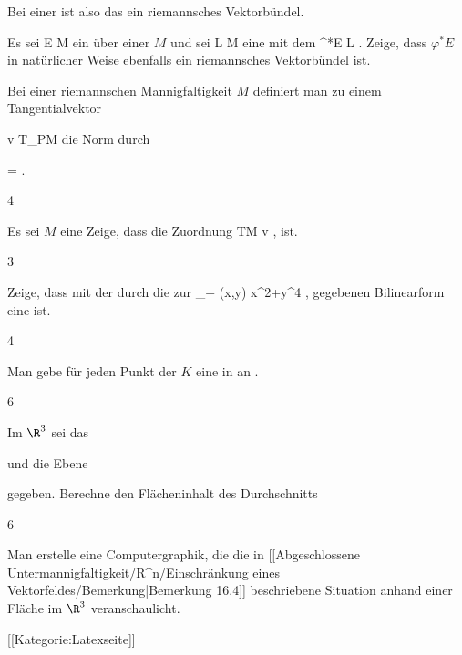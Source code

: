 Bei einer
ist also das
ein riemannsches Vektorbündel.

{}
{

Es sei
 { E } { M
} {}
ein
über einer
$M$ und sei
\maabb {\varphi} { L } { M
} {}
eine
mit dem
\maabb {} {\varphi^*E} {L
} {.}
Zeige, dass $\varphi^*E$ in natürlicher Weise ebenfalls ein riemannsches Vektorbündel ist.

}
{} {}


Bei einer riemannschen Mannigfaltigkeit $M$ definiert man zu einem Tangentialvektor

\mavergleichskette
{\vergleichskette
{ v
}
{ \in }{ T_PM
}
{  }{
}
{    }{
}
{   }{
}
}
{}{}{}
die Norm durch

\mavergleichskette
{\vergleichskette
{  \Vert
}
{ = }{ 
}
{  }{
}
{    }{
}
{   }{
}
}
{}{}{.}

{4}
{

Es sei $M$ eine
Zeige, dass die Zuordnung
\maabbeledisp {} {TM} {\R
} { v } {  \Vert
} {,}
ist.

}
{} {}

{3}
{

Zeige, dass
\mathl{\R \times \R_+}{} mit der durch die
 zur
 {\R \times \R_+} {\R
} {(x,y)} { x^2+y^4
} {,}
gegebenen Bilinearform eine
ist.

}
{} {}

{4}
{

Man gebe für jeden Punkt
 der
$K$ eine
in
 an
 {} {.}

}
{} {}

{6}
{

Im $\R^3$ sei das

 {  }
 und die Ebene

 {  }
 gegeben. Berechne den Flächeninhalt des Durchschnitts

}
{} {}

{6}
{

Man erstelle eine Computergraphik, die die in
[[Abgeschlossene Untermannigfaltigkeit/R^n/Einschränkung eines Vektorfeldes/Bemerkung|Bemerkung 16.4]]
beschriebene Situation anhand einer Fläche im $\R^3$ veranschaulicht.

}
{} {}

 [[Kategorie:Latexseite]]
